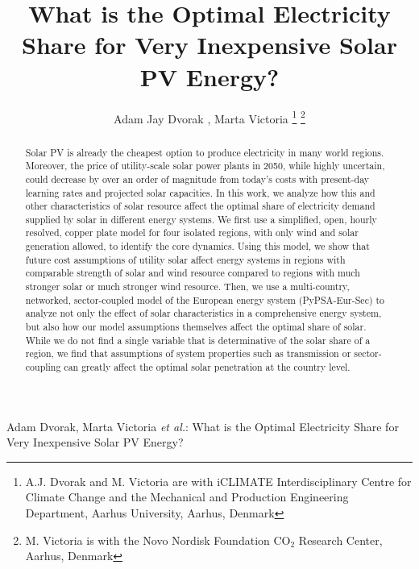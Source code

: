 \documentclass[lettersize,journal]{IEEEtran}
\begin{document}
\title{What is the Optimal Electricity Share for Very Inexpensive Solar PV Energy?}

\author{Adam Jay Dvorak , Marta Victoria 
\thanks{A.J. Dvorak and M. Victoria are with iCLIMATE Interdisciplinary Centre for Climate Change and the Mechanical and Production Engineering Department, Aarhus University, Aarhus, Denmark}
\thanks{M. Victoria is with the Novo Nordisk Foundation CO$_2$ Research Center, Aarhus, Denmark}}

{Adam Dvorak, Marta Victoria \MakeLowercase{\textit{et al.}}: What is the Optimal Electricity Share for Very Inexpensive Solar PV Energy?}


\maketitle

\begin{abstract}
Solar PV is already the cheapest option to produce electricity in many world regions. Moreover, the price of utility-scale solar power plants in 2050, while highly uncertain, could decrease by over an order of magnitude from today’s costs with present-day learning rates and projected solar capacities. In this work, we analyze how this and other characteristics of solar resource affect the optimal share of electricity demand supplied by solar in different energy systems. We first use a simplified, open, hourly resolved, copper plate model for four isolated regions, with only wind and solar generation allowed, to identify the core dynamics. Using this model, we show that future cost assumptions of utility solar affect energy systems in regions with comparable strength of solar and wind resource compared to regions with much stronger solar or much stronger wind resource. Then, we use a multi-country, networked, sector-coupled  model of the European energy system (PyPSA-Eur-Sec) to analyze not only the effect of solar characteristics in a comprehensive energy system, but also how our model assumptions themselves affect the optimal share of solar. While we do not find a single variable that is determinative of the solar share of a region, we find that assumptions of system properties such as transmission or sector-coupling can greatly affect the optimal solar penetration at the country level.
\end{abstract}
\end{document}
